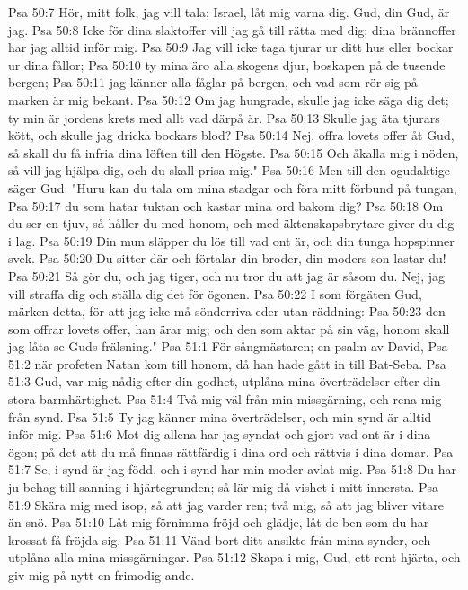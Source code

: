 Psa 50:7  Hör, mitt folk, jag vill tala; Israel, låt mig varna dig. Gud, din Gud, är jag.
Psa 50:8  Icke för dina slaktoffer vill jag gå till rätta med dig; dina brännoffer har jag alltid inför mig.
Psa 50:9  Jag vill icke taga tjurar ur ditt hus eller bockar ur dina fållor;
Psa 50:10  ty mina äro alla skogens djur, boskapen på de tusende bergen;
Psa 50:11  jag känner alla fåglar på bergen, och vad som rör sig på marken är mig bekant.
Psa 50:12  Om jag hungrade, skulle jag icke säga dig det; ty min är jordens krets med allt vad därpå är.
Psa 50:13  Skulle jag äta tjurars kött, och skulle jag dricka bockars blod?
Psa 50:14  Nej, offra lovets offer åt Gud, så skall du få infria dina löften till den Högste.
Psa 50:15  Och åkalla mig i nöden, så vill jag hjälpa dig, och du skall prisa mig."
Psa 50:16  Men till den ogudaktige säger Gud: "Huru kan du tala om mina stadgar och föra mitt förbund på tungan,
Psa 50:17  du som hatar tuktan och kastar mina ord bakom dig?
Psa 50:18  Om du ser en tjuv, så håller du med honom, och med äktenskapsbrytare giver du dig i lag.
Psa 50:19  Din mun släpper du lös till vad ont är, och din tunga hopspinner svek.
Psa 50:20  Du sitter där och förtalar din broder, din moders son lastar du!
Psa 50:21  Så gör du, och jag tiger, och nu tror du att jag är såsom du. Nej, jag vill straffa dig och ställa dig det för ögonen.
Psa 50:22  I som förgäten Gud, märken detta, för att jag icke må sönderriva eder utan räddning:
Psa 50:23  den som offrar lovets offer, han ärar mig; och den som aktar på sin väg, honom skall jag låta se Guds frälsning."
Psa 51:1  För sångmästaren; en psalm av David,
Psa 51:2  när profeten Natan kom till honom, då han hade gått in till Bat-Seba.
Psa 51:3  Gud, var mig nådig efter din godhet, utplåna mina överträdelser efter din stora barmhärtighet.
Psa 51:4  Två mig väl från min missgärning, och rena mig från synd.
Psa 51:5  Ty jag känner mina överträdelser, och min synd är alltid inför mig.
Psa 51:6  Mot dig allena har jag syndat och gjort vad ont är i dina ögon; på det att du må finnas rättfärdig i dina ord och rättvis i dina domar.
Psa 51:7  Se, i synd är jag född, och i synd har min moder avlat mig.
Psa 51:8  Du har ju behag till sanning i hjärtegrunden; så lär mig då vishet i mitt innersta.
Psa 51:9  Skära mig med isop, så att jag varder ren; två mig, så att jag bliver vitare än snö.
Psa 51:10  Låt mig förnimma fröjd och glädje, låt de ben som du har krossat få fröjda sig.
Psa 51:11  Vänd bort ditt ansikte från mina synder, och utplåna alla mina missgärningar.
Psa 51:12  Skapa i mig, Gud, ett rent hjärta, och giv mig på nytt en frimodig ande.
